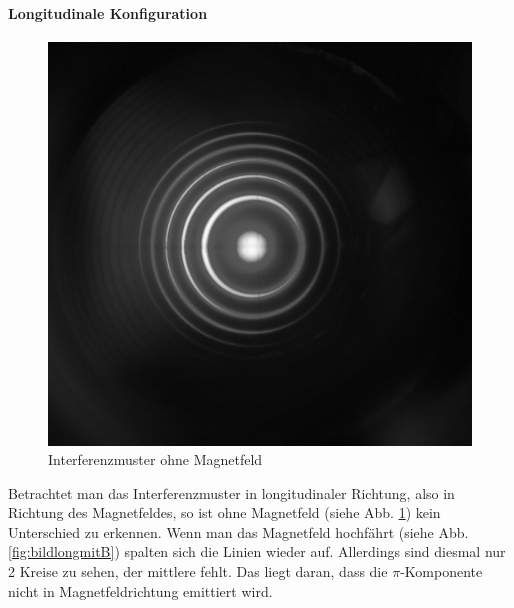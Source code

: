 \paragraph{Longitudinale Konfiguration}
\begin{figure}
\centering
\includegraphics[scale=0.1]{data/bilder_okular/bild_5_edit.jpg}
\caption{Interferenzmuster ohne Magnetfeld}
\label{fig:bildlongohneB}
\end{figure}
Betrachtet man das Interferenzmuster in longitudinaler Richtung, also in Richtung des Magnetfeldes, so ist ohne Magnetfeld (siehe Abb. \ref{fig:bildlongohneB}) kein Unterschied zu erkennen. Wenn man das Magnetfeld hochfährt (siehe Abb. \ref{fig:bildlongmitB}) spalten sich die Linien wieder auf. Allerdings sind diesmal nur 2 Kreise zu sehen, der mittlere fehlt. Das liegt daran, dass die $\pi$-Komponente nicht in Magnetfeldrichtung emittiert wird.
